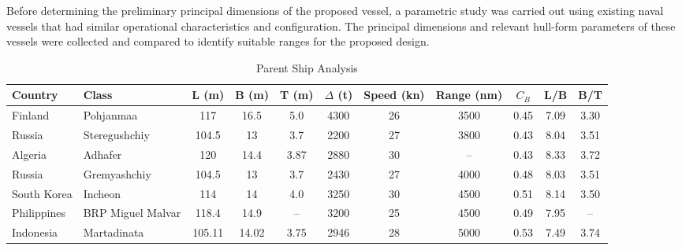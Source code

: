 \documentclass[12pt,a4paper,twoside]{report}
\begin{document}
Before determining the preliminary principal dimensions of the proposed vessel,
a parametric study was carried out using existing naval vessels that had similar
operational characteristics and configuration. The principal dimensions and
relevant hull-form parameters of these vessels were collected and compared to
identify suitable ranges for the proposed design.

\begin{table}[htbp]
    \centering
    \caption{Parent Ship Analysis}
    \label{tab:parent_ship_analysis}

    \scriptsize
    \setlength{\tabcolsep}{3.5pt}

    \begin{tabular}{llccccccccc}
        \toprule
        \textbf{Country} &
        \textbf{Class} &
        \textbf{L (m)} &
        \textbf{B (m)} &
        \textbf{T (m)} &
        \textbf{$\Delta$ (t)} &
        \textbf{Speed (kn)} &
        \textbf{Range (nm)} &
        \textbf{$C_B$} &
        \textbf{L/B} &
        \textbf{B/T} \\
        \midrule

        Finland &
        Pohjanmaa \cite{pohjanmaa_rmc} &
        117 & 16.5 & 5.0 & 4300 & 26 & 3500 & 0.45 & 7.09 & 3.30 \\

        Russia &
        Steregushchiy \cite{steregushchiy_oni} &
        104.5 & 13 & 3.7 & 2200 & 27 & 3800 & 0.43 & 8.04 & 3.51 \\

        Algeria &
        Adhafer \cite{adhafer_c28a} &
        120 & 14.4 & 3.87 & 2880 & 30 & -- & 0.43 & 8.33 & 3.72 \\

        Russia &
        Gremyashchiy \cite{gremyashchiy_oni} &
        104.5 & 13 & 3.7 & 2430 & 27 & 4000 & 0.48 & 8.03 & 3.51 \\

        South Korea &
        Incheon \cite{incheon_helis} &
        114 & 14 & 4.0 & 3250 & 30 & 4500 & 0.51 & 8.14 & 3.50 \\

        Philippines &
        BRP Miguel Malvar \cite{miguel_malvar_pna} &
        118.4 & 14.9 & -- & 3200 & 25 & 4500 & 0.49 & 7.95 & -- \\

        Indonesia &
        Martadinata \cite{martadinata_class} &
        105.11 & 14.02 & 3.75 & 2946 & 28 & 5000 & 0.53 & 7.49 & 3.74 \\


\end{tabular}
\end{table}
\end{document}
